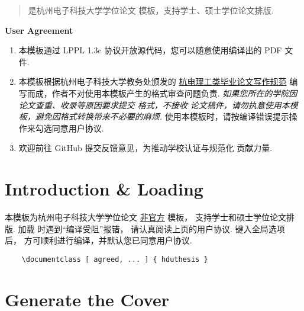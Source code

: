 \documentclass[l3doc]{hduthesis}
\begin{document}
\maketitle

\begin{abstract}
   是杭州电子科技大学学位论文  模板，支持学士、硕士学位论文排版.
\end{abstract}

\begin{center}
  \small\bfseries User Agreement
\end{center}
\begin{enumerate}\small
  \item 本模板通过 LPPL 1.3c 协议开放源代码，您可以随意使用编译出的 PDF 文件.
  \item 本模板根据杭州电子科技大学教务处颁发的 \href{https://jwc.hdu.edu.cn/2022/0428/c4528a153813/page.htm}{杭电理工类毕业论文写作规范} 编写而成，作者不对使用本模板产生的格式审查问题负责. \emph{如果您所在的学院因论文查重、收录等原因要求提交  格式，不接收  论文稿件，请勿执意使用本模板，避免因格式转换带来不必要的麻烦.} 使用本模板时，请按编译错误提示操作来勾选同意用户协议.
  \item 欢迎前往 GitHub 提交反馈意见，为推动学校认证与规范化  贡献力量.
\end{enumerate}
\endtitlepage
\restoregeometry

\section{Introduction \& Loading }

本模板为杭州电子科技大学学位论文 \underline{非官方}  模板，
支持学士和硕士学位论文排版. 加载  时遇到``编译受阻''报错，
请认真阅读上页的用户协议. 键入全局选项  后，
方可顺利进行编译，并默认您已同意用户协议.

\begin{framed}
  \begin{verbatim}
    \documentclass [ agreed, ... ] { hduthesis }
  \end{verbatim}
\end{framed}

\section{Generate the Cover}
\end{document}
